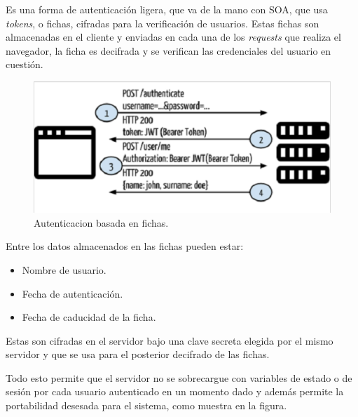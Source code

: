     Es una forma de autenticación ligera, que va de la mano con SOA, que usa \textit{tokens}, o fichas, cifradas para la verificación de usuarios. Estas fichas son almacenadas en el cliente y enviadas en cada una de los \textit{requests} que realiza el navegador, la ficha es decifrada y se verifican las credenciales del usuario en cuestión\cite{TOKEN-tokenbasedauth}.
    
    \begin{figure}
        \begin{center}
            \includegraphics[scale=.5]{figures/tokenbarequest}
        \end{center}
        \caption{Autenticacion basada en fichas.}
    \end{figure}
    
    Entre los datos almacenados en las fichas pueden estar:
    
    \begin{itemize}
        \item Nombre de usuario.
        \item Fecha de autenticación.
        \item Fecha de caducidad de la ficha.
    \end{itemize}
    
    Estas son cifradas en el servidor bajo una clave secreta elegida por el mismo servidor y que se usa para el posterior decifrado de las fichas.
    
    Todo esto permite que el servidor no se sobrecargue con variables de estado o de sesión por cada usuario autenticado en un momento dado y además permite la portabilidad desesada para el sistema, como muestra en la figura.
    
